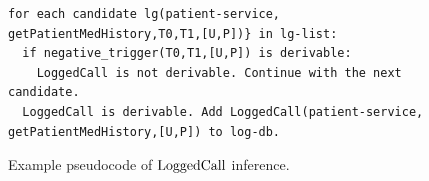 \begin{figure}
\begin{tiny}
\begin{Verbatim}[frame=single]
for each candidate lg(patient-service, getPatientMedHistory,T0,T1,[U,P])} in lg-list:
  if negative_trigger(T0,T1,[U,P]) is derivable:
    LoggedCall is not derivable. Continue with the next candidate. 
  LoggedCall is derivable. Add LoggedCall(patient-service, getPatientMedHistory,[U,P]) to log-db.
\end{Verbatim}
\end{tiny}
\caption{Example pseudocode of $\mathrm{LoggedCall}$ inference.}
\label{fig:exm-loggedcall}
\end{figure}





%
